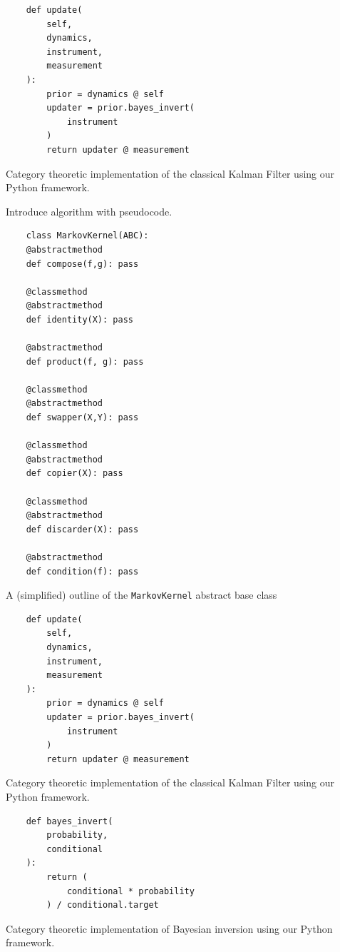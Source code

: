\documentclass[letterpaper, 10 pt, conference]{ieeeconf}  %
\begin{document}
\begin{listing}
\begin{verbatim}
    def update(
        self, 
        dynamics, 
        instrument, 
        measurement
    ):
        prior = dynamics @ self
        updater = prior.bayes_invert(
            instrument
        )
        return updater @ measurement
\end{verbatim}
\caption{Category theoretic implementation of the classical Kalman Filter using our Python framework.}
\label{listing:1}
\end{listing}

Introduce algorithm with pseudocode.

\begin{listing}
\begin{verbatim}
    class MarkovKernel(ABC):
	@abstractmethod
	def compose(f,g): pass

	@classmethod
	@abstractmethod
	def identity(X): pass

	@abstractmethod
	def product(f, g): pass

	@classmethod
	@abstractmethod
	def swapper(X,Y): pass

	@classmethod
	@abstractmethod
	def copier(X): pass

	@classmethod
	@abstractmethod
	def discarder(X): pass

	@abstractmethod
	def condition(f): pass
\end{verbatim}
    \caption{A (simplified) outline of the \texttt{MarkovKernel} abstract base class}
\label{listing:1}
\end{listing}

\begin{listing}
\begin{verbatim}
    def update(
        self, 
        dynamics, 
        instrument, 
        measurement
    ):
        prior = dynamics @ self
        updater = prior.bayes_invert(
            instrument
        )
        return updater @ measurement
\end{verbatim}
\caption{Category theoretic implementation of the classical Kalman Filter using our Python framework.}
\label{listing:1}
\end{listing}


\begin{listing}
\begin{verbatim}
    def bayes_invert(
        probability, 
        conditional
    ):
        return (
            conditional * probability
        ) / conditional.target
\end{verbatim}
\caption{Category theoretic implementation of Bayesian inversion using our Python framework.}
\label{listing:1}
\end{listing}
\end{document}
